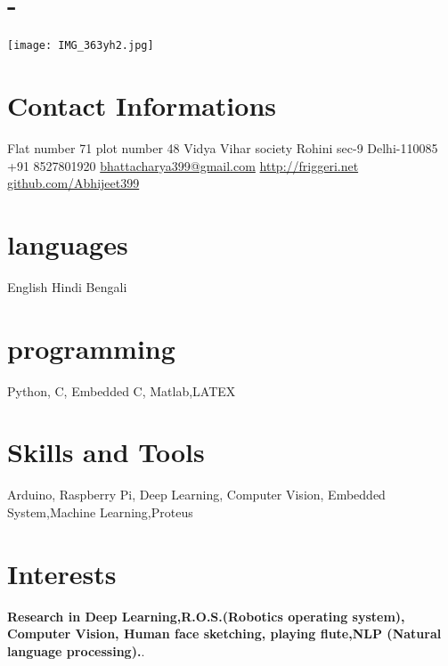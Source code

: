 \documentclass[espanol]{cv-style}     %
\begin{document}
\lastupdated

\begin{aside}
\section{-}
\texttt{[image: IMG\_363yh2.jpg]}
%
\section{Contact Informations}
    Flat number 71
    plot number 48
    Vidya Vihar society
    Rohini sec-9
    Delhi-110085
    ~
    +91 8527801920
    \href{mailto:bhattacharya399@gmail.com}{bhattacharya399@gmail.com}
    \href{http://friggeri.net}{http://friggeri.net}
    \href{https://github.com/Abhijeet399}{github.com/Abhijeet399}
%
\section{languages}
    English
    Hindi
    Bengali
  \section{programming}
    Python, C,
    Embedded C,
    Matlab,LATEX
  \section{Skills and Tools}
    Arduino, Raspberry Pi, Deep Learning, Computer Vision,
    Embedded System,Machine Learning,Proteus
%
\end{aside}
\vspace{0.2cm}
\section{Interests}
  \vspace{-0.2cm}
 \textbf{Research in Deep Learning,R.O.S.(Robotics operating system), Computer Vision, Human face sketching, playing flute,NLP (Natural language processing).}.
\end{document}
